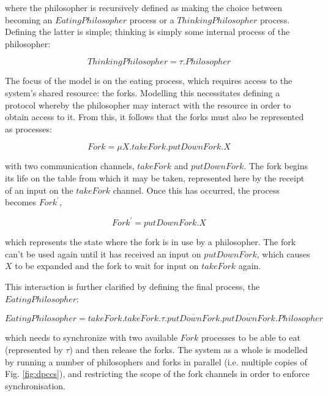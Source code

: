 \noindent where the philosopher is recursively defined as making the
choice between becoming an $EatingPhilosopher$ process or a
$ThinkingPhilosopher$ process.  Defining the latter is simple; 
thinking is simply some internal process of the philosopher:

\begin{equation}
ThinkingPhilosopher = \tau .Philosopher
\end{equation}

The focus of the model is on the eating process, which requires
access to the system's shared resource: the forks.  Modelling this
necessitates defining a protocol whereby the philosopher may interact
with the resource in order to obtain access to it.  From this, it
follows that the forks must also be represented as processes:

\begin{equation}
Fork = \mu X.takeFork.putDownFork.X
\end{equation}

\noindent with two communication channels, $takeFork$ and
$putDownFork$.  The fork begins its life on the table from which it
may be taken, represented here by the receipt of an input on the
$takeFork$ channel.  Once this has occurred, the process becomes
$Fork^\prime$,

\begin{equation}
Fork^\prime = putDownFork.X
\end{equation}

\noindent which represents the state where the fork is in use by a
philosopher.  The fork can't be used again until it has received an
input on $putDownFork$, which causes $X$ to be expanded and the fork to
wait for input on $takeFork$ again.

This interaction is further clarified by defining the final process,
the $EatingPhilosopher$:

\begin{equation}
EatingPhilosopher = \overline{takeFork}.\overline{takeFork}.\tau.\overline{putDownFork}.\overline{putDownFork}.Philosopher
\end{equation}

\noindent which needs to synchronize with two available $Fork$
processes to be able to eat (represented by $\tau$) and then release
the forks.  The system as a whole is modelled by running a number of
philosophers and forks in parallel (i.e. multiple copies of
Fig. \ref{fig:dpccs}), and restricting the scope of the fork channels
in order to enforce synchronisation.

